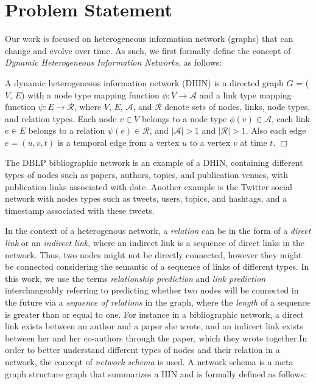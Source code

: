 \section{Problem Statement}


Our work is focused on heterogeneous information network (graphs) that can change and evolve over time. As such, we first formally define the concept of \textit{Dynamic Heterogeneous Information Networks}, as follows:


\begin{definition} A dynamic heterogeneous information network (DHIN) is a directed graph $G$ = ($V$, $E$) with a node type mapping function $\phi: V \rightarrow \mathcal{A}$ and a link type mapping function $\psi: E \rightarrow \mathcal{R}$, where $V$, $E$, $\mathcal{A}$, and $\mathcal{R}$ denote sets of nodes, links, node types, and relation types. Each node $v \in V$ belongs to a node type $\phi(v) \in \mathcal{A}$, each link $e \in E$ belongs to a relation $\psi(e) \in \mathcal{R}$, and $|\mathcal{A}| > 1$ and $|\mathcal{R}| > 1$. Also each edge $e = (u, v, t)$ is a temporal edge from a vertex $u$ to a vertex $v$ at time $t$. $\Box$ \end{definition}

The DBLP bibliographic network%
is an example of a DHIN, containing different types of nodes such as papers, authors, topics, and publication venues, with publication links associated with date. Another example is the Twitter social network with nodes types such as tweets, users, topics, and hashtags, and a timestamp associated with these tweets. 

In the context of a heterogenous network, a \textit{relation} can be in the form of a \textit{direct link} or an \textit{indirect link}, where an indirect link is a sequence of direct links in the network. Thus, two nodes might not be directly connected, however they might be connected considering the semantic of a sequence of links of different types. In this work, we use the terms \textit{relationship prediction} and \textit{link prediction} interchangeably referring to predicting whether two nodes will be connected in the future via a \textit{sequence of relations} in the graph, where the \textit{length} of a sequence is greater than or equal to one. For instance in a bibliographic network, a direct link exists between an author and a paper she wrote, and an indirect link exists between her and her co-authors through the paper, which they wrote together.In order to better understand different types of nodes and their relation in a network, the concept of \textit{network schema} \cite{sun2011pathsim} is used. A network schema is a meta graph structure graph that summarizes a HIN and is formally defined as follows:

